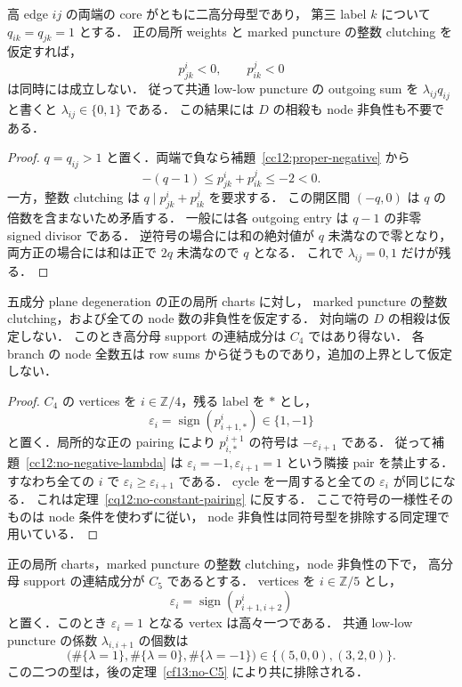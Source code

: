\begin{lemma}
\label{cc12:no-negative-lambda}
高 edge $ij$ の両端の core がともに二高分母型であり，
第三 label $k$ について $q_{ik}=q_{jk}=1$ とする．
正の局所 weights と marked puncture の整数 clutching を仮定すれば，
\[
 p^i_{jk}<0,\qquad p^j_{ik}<0
\]
は同時には成立しない．
従って共通 low-low puncture の outgoing sum を
$\lambda_{ij}q_{ij}$ と書くと $\lambda_{ij}\in\{0,1\}$ である．
この結果には $D$ の相殺も node 非負性も不要である．
\end{lemma}

\begin{proof}
$q=q_{ij}>1$ と置く．両端で負なら補題~\ref{cc12:proper-negative} から
\[
 -(q-1)\leq p^i_{jk}+p^j_{ik}\leq-2<0.
\]
一方，整数 clutching は $q\mid p^i_{jk}+p^j_{ik}$ を要求する．
この開区間 $(-q,0)$ は $q$ の倍数を含まないため矛盾する．
一般には各 outgoing entry は $q-1$ の非零 signed divisor である．
逆符号の場合には和の絶対値が $q$ 未満なので零となり，
両方正の場合には和は正で $2q$ 未満なので $q$ となる．
これで $\lambda_{ij}=0,1$ だけが残る．
\end{proof}

\begin{theorem}[四角形成分の完全排除]
\label{cc12:no-C4}
五成分 plane degeneration の正の局所 charts に対し，
marked puncture の整数 clutching，および全ての node 数の非負性を仮定する．
対向端の $D$ の相殺は仮定しない．
このとき高分母 support の連結成分は $C_4$ ではあり得ない．
各 branch の node 全数五は row sums から従うものであり，追加の上界として仮定しない．
\end{theorem}

\begin{proof}
$C_4$ の vertices を $i\in\mathbb Z/4$，残る label を $*$ とし，
\[
 \varepsilon_i=\operatorname{sign}(p^i_{i+1,*})\in\{1,-1\}
\]
と置く．局所的な正の pairing により
$p^{i+1}_{i,*}$ の符号は $-\varepsilon_{i+1}$ である．
従って補題~\ref{cc12:no-negative-lambda} は
$\varepsilon_i=-1,\varepsilon_{i+1}=1$ という隣接 pair を禁止する．
すなわち全ての $i$ で $\varepsilon_i\geq\varepsilon_{i+1}$ である．
cycle を一周すると全ての $\varepsilon_i$ が同じになる．
これは定理~\ref{cq12:no-constant-pairing} に反する．
ここで符号の一様性そのものは node 条件を使わずに従い，
node 非負性は同符号型を排除する同定理で用いている．
\end{proof}

\begin{corollary}
\label{cc12:C5-two-types}
正の局所 charts，marked puncture の整数 clutching，node 非負性の下で，
高分母 support の連結成分が $C_5$ であるとする．
vertices を $i\in\mathbb Z/5$ とし，
\[
 \varepsilon_i=\operatorname{sign}(p^i_{i+1,i+2})
\]
と置く．このとき $\varepsilon_i=1$ となる vertex は高々一つである．
共通 low-low puncture の係数 $\lambda_{i,i+1}$ の個数は
\[
 \bigl(\#\{\lambda=1\},\#\{\lambda=0\},\#\{\lambda=-1\}\bigr)
 \in\{(5,0,0),(3,2,0)\}.
\]
この二つの型は，後の定理~\ref{cf13:no-C5} により共に排除される．
\end{corollary}


